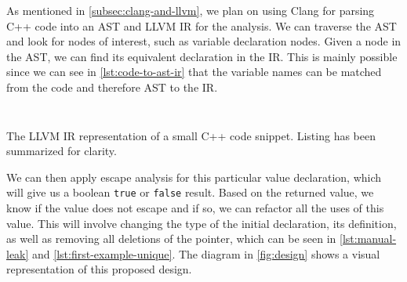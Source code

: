 \documentclass{proposal}
\begin{document}
    As mentioned in \autoref{subsec:clang-and-llvm}, we plan on using Clang for parsing C++ code into an AST and LLVM IR for the analysis.
    We can traverse the AST and look for nodes of interest, such as variable declaration nodes.
    Given a node in the AST, we can find its equivalent declaration in the IR\@.
    This is mainly possible since we can see in \autoref{lst:code-to-ast-ir} that the variable names can be matched from the code and therefore AST to the IR\@.

    \begin{listing}
        \inputminted{c++}{code/code-to-ast.cpp}
        \inputminted[fontsize=\footnotesize]{llvm}{code/code-to-ast-summary.ll}
        \caption{The LLVM IR representation of a small C++ code snippet. Listing has been summarized for clarity.}
        \label{lst:code-to-ast-ir}
    \end{listing}

    We can then apply escape analysis for this particular value declaration, which will give us a boolean \texttt{true} or \texttt{false} result.
    Based on the returned value, we know if the value does not escape and if so, we can refactor all the uses of this value.
    This will involve changing the type of the initial declaration, its definition, as well as removing all deletions of the pointer, which can be seen in \autoref{lst:manual-leak} and \autoref{lst:first-example-unique}.
    The diagram in \autoref{fig:design} shows a visual representation of this proposed design.
\end{document}
